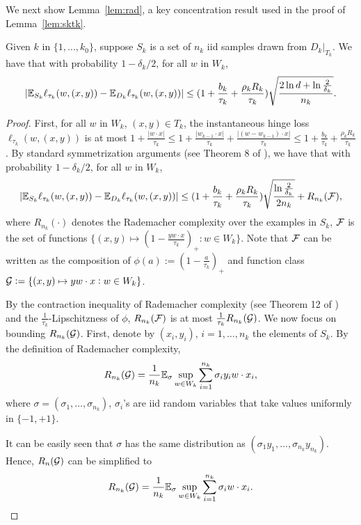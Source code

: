 We next show Lemma~\ref{lem:rad}, a key concentration result used in the proof of Lemma~\ref{lem:sktk}.
\begin{lemma}
Given $k$ in $\{1,\ldots,k_0\}$, suppose $S_k$ is a set of $n_k$ iid samples drawn from $D_k |_{T_k}$. We have that with probability $1-\delta_k/2$,
for all $w$ in $W_k$,
\[
|\mathbb{E}_{S_k} \ell_{\tau_k}(w, (x, y)) - \mathbb{E}_{D_k} \ell_{\tau_k}(w, (x, y))|
\leq
(1 + \frac{b_k}{\tau_k} + \frac{\rho_k R_k}{\tau_k}) \sqrt{\frac{2 \ln d + \ln \frac 2 {\delta_k}}{n_k}}.
\]
\label{lem:rad}
\end{lemma}
\begin{proof}
First, for all $w$ in $W_k$, $(x,y) \in T_k$, the instantaneous hinge loss $\ell_{\tau_k}(w, (x, y))$ is at most $1+\frac{|w \cdot x|}{\tau_k} \leq 1+\frac{|w_{k-1} \cdot x|}{\tau_k}+\frac{|(w-w_{k-1}) \cdot x|}{\tau_k} \leq 1 +\frac{b_k}{\tau_k} + \frac{\rho_k R_k}{\tau_k}$.
By standard symmetrization arguments (see Theorem 8 of \cite{BM02}), we have that with probability $1-\delta_k/2$, for all $w$ in $W_k$,
\begin{equation}
|\mathbb{E}_{S_k} \ell_{\tau_k}(w, (x, y)) - \mathbb{E}_{D_k} \ell_{\tau_k}(w, (x, y))| \leq (1 + \frac{b_k}{\tau_k} + \frac{\rho_k R_k}{\tau_k})\sqrt{\frac{\ln \frac 2 {\delta_k}}{2 n_k}} + R_{n_k}(\mathcal{F}),
\label{eqn:hoeff}
\end{equation}
where $R_{n_k}(\cdot)$ denotes the Rademacher complexity over the examples in $S_k$,
$\mathcal{F}$ is the set of functions $\{(x,y) \mapsto (1- \frac{y w \cdot x}{\tau_k})_+: w \in W_k \}$.
Note that $\mathcal{F}$ can be written as the composition of $\phi(a):= (1- \frac{a}{\tau_k})_+$ and function class
$\mathcal{G} := \{(x,y) \mapsto y w \cdot x: w \in W_k \}$.

By the contraction inequality of Rademacher complexity (see Theorem 12 of \cite{BM02}) and the $\frac{1}{\tau_k}$-Lipschitzness of $\phi$,
$R_{n_k}(\mathcal{F})$ is at most $\frac{1}{\tau_k} R_{n_k}(\mathcal{G})$. We now focus on bounding $R_{n_k}(\mathcal{G})$. First,
denote by $(x_i, y_i)$, $i=1,\ldots,n_k$ the elements of $S_k$. By the definition of Rademacher complexity,
\[ R_{n_k}(\mathcal{G}) = \frac 1 {n_k} \mathbb{E}_\sigma \sup_{w \in W_k} \sum_{i=1}^{n_k} \sigma_i y_i w \cdot x_i,  \]
where $\sigma = (\sigma_1, \ldots, \sigma_{n_k})$, $\sigma_i$'s are iid random variables that take values uniformly in $\{-1,+1\}$.

It can be easily seen that $\sigma$ has the same distribution as $(\sigma_1 y_1, \ldots, \sigma_{n_k} y_{n_k})$. Hence, $R_n(\mathcal{G})$ can be simplified to
\[ R_{n_k}(\mathcal{G}) = \frac 1 {n_k} \mathbb{E}_\sigma \sup_{w \in W_k} \sum_{i=1}^{n_k} \sigma_i w \cdot x_i.  \]


\end{proof}
